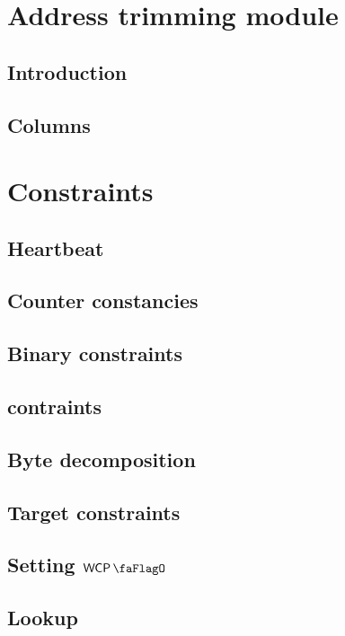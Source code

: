 \section{Address trimming module}
\subsection{Introduction}               
\subsection{Columns}                    

\section{Constraints}
\subsection{Heartbeat}                  \label{sec: heartbeat} 
\subsection{Counter constancies}        
\subsection{Binary constraints}         
\subsection{\plateauBit{} contraints}   
\subsection{Byte decomposition}         
\subsection{Target constraints}         
\subsection{Setting $\wcpFlag$}         
\subsection{Lookup}                     

